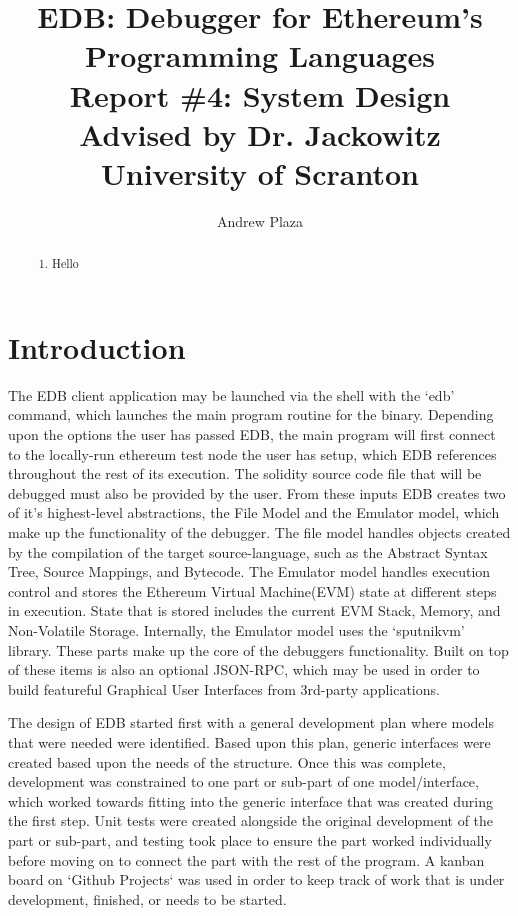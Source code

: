 \documentclass{report}
\title{%
    EDB: Debugger for Ethereum's Programming Languages \\
	\medskip
	\large Report \#4: System Design \\
    \large Advised by Dr. Jackowitz	\\
	\large University of Scranton}
\author{Andrew Plaza}
\begin{document}
\maketitle
\newpage

\begin{abstract}
    \begin{enumerate}
        \item Hello
    \end{enumerate}
\end{abstract}

\tableofcontents
\newpage

\section{Introduction}
    The EDB client application may be launched via the shell with the `edb' command, which launches the main program routine for the binary. Depending upon the options the user has passed EDB, the main program will first connect to the locally-run ethereum test node the user has setup, which EDB references throughout the rest of its execution. The solidity source code file that will be debugged must also be provided by the user. From these inputs EDB creates two of it's highest-level abstractions, the File Model and the Emulator model, which make up the functionality of the debugger. The file model handles objects created by the compilation of the target source-language, such as the Abstract Syntax Tree, Source Mappings, and Bytecode. The Emulator model handles execution control and stores the Ethereum Virtual Machine(EVM) state at different steps in execution. State that is stored includes the current EVM Stack, Memory, and Non-Volatile Storage. Internally, the Emulator model uses the `sputnikvm' library. These parts make up the core of the debuggers functionality. Built on top of these items is also an optional JSON-RPC, which may be used in order to build featureful Graphical User Interfaces from 3rd-party applications.

    The design of EDB started first with a general development plan where models that were needed were identified. Based upon this plan, generic interfaces were created based upon the needs of the structure. Once this was complete, development was constrained to one part or sub-part of one model/interface, which worked towards fitting into the generic interface that was created during the first step. Unit tests were created alongside the original development of the part or sub-part, and testing took place to ensure the part worked individually before moving on to connect the part with the rest of the program. A kanban board on `Github Projects` was used in order to keep track of work that is under development, finished, or needs to be started.
\end{document}
